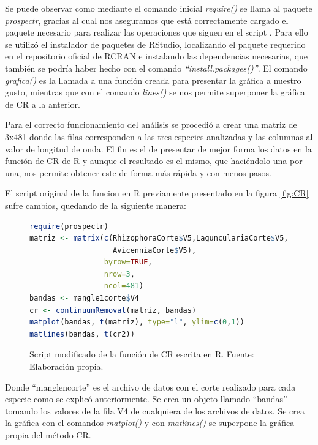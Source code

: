 Se puede observar como mediante el comando inicial \textit{require()} se llama al paquete \textit{prospectr}, gracias al cual nos aseguramos que está correctamente cargado el paquete necesario para realizar las operaciones que siguen en el script \citep{stevens2014introduction}. Para ello se utilizó el instalador de paquetes de RStudio, localizando el paquete requerido en el repositorio oficial de RCRAN e instalando las dependencias necesarias, que también se podría haber hecho con el comando \textit{``install.packages()''}. El comando \textit{grafica()} es la llamada a una función creada para presentar la gráfica a nuestro gusto, mientras que con el comando \textit{lines()} se nos permite superponer la gráfica de \ac{CR} a la anterior.\Sep

Para el correcto funcionamiento del análisis se procedió a crear una matriz de 3x481 donde las filas corresponden a las tres especies analizadas y las columnas al valor de longitud de onda. El fin es el de presentar de mejor forma los datos en la función de \ac{CR} de R y aunque el resultado es el mismo, que haciéndolo una por una, nos permite obtener este de forma más rápida y con menos pasos.\Sep

El script original de la funcion en R previamente presentado en la figura \ref{fig:CR} sufre cambios, quedando de la siguiente manera:\SmallSep

\begin{figure}[ht]
	\centering
	\begin{lstlisting}[language = R, frame = single]
require(prospectr)
matriz <- matrix(c(RhizophoraCorte$V5,LagunculariaCorte$V5,
                   AvicenniaCorte$V5),
                 byrow=TRUE,
                 nrow=3,
                 ncol=481)
bandas <- mangle1corte$V4
cr <- continuumRemoval(matriz, bandas)
matplot(bandas, t(matriz), type="l", ylim=c(0,1))
matlines(bandas, t(cr2))
	\end{lstlisting}
	\caption[Función modificada de CR]{Script modificado de la función de CR escrita en R. Fuente: Elaboración propia.}
	\label{fig:CRmodificado}
\end{figure}	

Donde ``manglencorte'' es el archivo de datos con el corte realizado para cada especie como se explicó anteriormente. Se crea un objeto llamado ``bandas'' tomando los valores de la fila V4 de cualquiera de los archivos de datos. Se crea la gráfica con el comandos \textit{matplot()} y con \textit{matlines()} se superpone la gráfica propia del método \ac{CR}.\Sep

